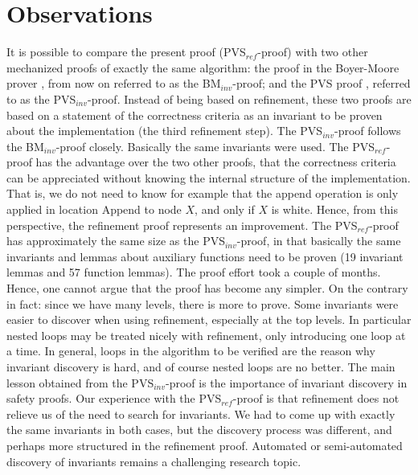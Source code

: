
\newcommand{\bm}{BM$_{inv}$}
\newcommand{\pvsinv}{PVS$_{inv}$}
\newcommand{\pvsref}{PVS$_{ref}$}
\newcommand{\unity}{UNITY$_{ref}$}


\section{Observations}
\label{observations}

It is possible  to compare the  present proof (\pvsref-proof) with two
other  mechanized proofs of exactly  the same algorithm:  the proof in
the Boyer-Moore prover \cite{Rus:GC},  from now on  referred to as the
\bm-proof; and   the  PVS proof   \cite{havelund-pvs-gc-99},  
referred  to as  the \pvsinv-proof.  Instead of being based on refinement, these two proofs
are  based on a statement of  the correctness criteria as an invariant
to be  proven about the  implementation (the third refinement step)\@. 
The \pvsinv-proof follows  the \bm-proof closely.  Basically  the same
invariants were used. The \pvsref-proof has the advantage over the two
other proofs, that the correctness criteria can be appreciated without
knowing the internal structure of  the implementation.  That is, we do
not need to know for example that the append operation is only applied
in location  {\sc  Append} to node  $X$,  and only  if  $X$ is white.  
Hence, from  this  perspective,  the  refinement proof  represents  an
improvement.  The \pvsref-proof has approximately the same size as the
\pvsinv-proof, in that basically  the same invariants and lemmas about
auxiliary functions  need to  be proven (19   invariant lemmas and  57
function lemmas). The  proof effort took a couple   of months.  Hence,
one  cannot argue that  the proof   has  become any  simpler.   On the
contrary in fact: since  we have many levels, there  is more to prove. 
Some   invariants were easier   to   discover when using   refinement,
especially  at the  top  levels. In  particular  nested  loops may  be
treated  nicely with refinement, only introducing  one loop at a time. 
In general, loops in  the algorithm to be  verified are the reason why
invariant discovery is hard, and of course nested loops are no better.
The main lesson  obtained from the \pvsinv-proof  is the importance of
invariant discovery in   safety   proofs.  Our experience  with    the
\pvsref-proof is  that refinement does not  relieve us of  the need to
search for   invariants. We  had to  come   up with exactly   the same
invariants in both cases, but the discovery process was different, and
perhaps more structured in the refinement proof.
Automated or semi-automated discovery of invariants remains a challenging research topic.



